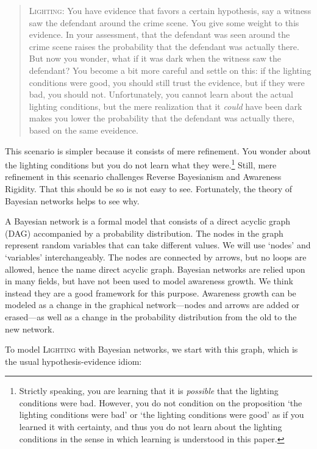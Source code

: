 \documentclass[
  11pt,
  dvipsnames,enabledeprecatedfontcommands]{scrartcl}
\begin{document}
\begin{quote}
\textsc{Lighting:} You have evidence that favors a certain hypothesis,
say a witness saw the defendant around the crime scene. You give some
weight to this evidence. In your assessment, that the defendant was seen
around the crime scene raises the probability that the defendant was
actually there. But now you wonder, what if it was dark when the witness
saw the defendant? You become a bit more careful and settle on this: if
the lighting conditions were good, you should still trust the evidence,
but if they were bad, you should not. Unfortunately, you cannot learn
about the actual lighting conditions, but the mere realization that it
\textit{could} have been dark makes you lower the probability that the
defendant was actually there, based on the same eveidence.
\end{quote}

\noindent This scenario is simpler because it consists of mere
refinement. You wonder about the lighting conditions but you do not
learn what they were.\footnote{Strictly speaking, you are learning that
  it is \emph{possible} that the lighting conditions were bad. However,
  you do not condition on the proposition `the lighting conditions were
  bad' or `the lighting conditions were good' as if you learned it with
  certainty, and thus you do not learn about the lighting conditions in
  the sense in which learning is understood in this paper.} Still, mere
refinement in this scenario challenges Reverse Bayesianism and Awareness
Rigidity. That this should be so is not easy to see. Fortunately, the
theory of Bayesian networks helps to see why.

A Bayesian network is a formal model that consists of a direct acyclic
graph (DAG) accompanied by a probability distribution. The nodes in the
graph represent random variables that can take different values. We will
use `nodes' and `variables' interchangeably. The nodes are connected by
arrows, but no loops are allowed, hence the name direct acyclic graph.
Bayesian networks are relied upon in many fields, but have not been used
to model awareness growth. We think instead they are a good framework
for this purpose. Awareness growth can be modeled as a change in the
graphical network---nodes and arrows are added or erased---as well as a
change in the probability distribution from the old to the new network.

To model \textsc{Lighting} with Bayesian networks, we start with this
graph, which is the usual hypothesis-evidence idiom:
\end{document}
